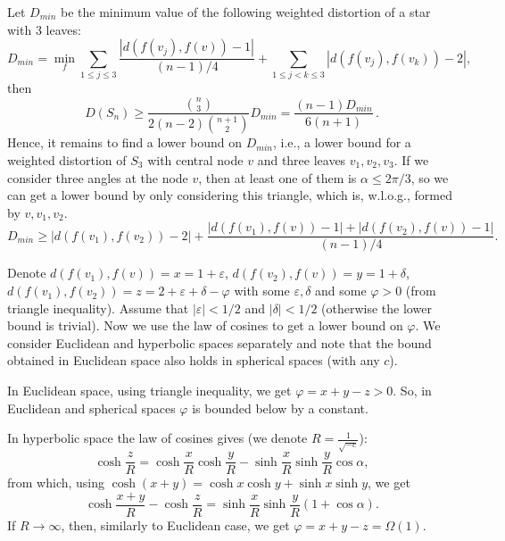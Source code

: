 \documentclass[runningheads]{llncs}
\begin{document}
Let $D_{min}$ be the minimum value of the following weighted distortion of a star with 3 leaves:
\[
D_{min} = \min_{f} \sum_{1\le j \le 3}  \frac{|d(f(v_j),f(v)) - 1|}{(n-1)/4} +
\sum_{1\le j < k\le 3}  |d(f(v_j),f(v_k)) - 2|,
\]
then 
\begin{equation}\label{eq:D_min}
D(S_n) \ge \frac{{n\choose 3}}{2(n-2){n+1 \choose 2}} D_{min} = \frac{ (n-1)D_{min}}{6(n+1)}\,.
\end{equation}
Hence, it remains to find a lower bound on $D_{min}$, i.e., a lower bound for a weighted distortion of $S_3$ with central node $v$ and three leaves $v_1, v_2, v_3$.
If we consider three angles at the node $v$, then at least one of them is $\alpha \le 2 \pi / 3$, so we can get a lower bound by only considering this triangle, which is, w.l.o.g., formed by $v, v_1, v_2$.
\[
D_{min} \ge  |d(f(v_1),f(v_2)) - 2| + \frac{|d(f(v_1),f(v)) - 1| + |d(f(v_2),f(v)) - 1|}{(n-1)/4}.
\]

Denote $d(f(v_1),f(v)) = x = 1 + \varepsilon$, $d(f(v_2),f(v)) = y = 1 + \delta$, $d(f(v_1),f(v_2)) = z = 2 + \varepsilon + \delta - \varphi$ with some $\varepsilon, \delta$ and some $\varphi > 0$ (from triangle inequality). Assume that $|\varepsilon| < 1/2$ and $|\delta| < 1/2$ (otherwise the lower bound is trivial). Now we use the law of cosines to get a lower bound on $\varphi$.
We consider Euclidean and hyperbolic spaces separately and note that the bound obtained in Euclidean space also holds in spherical spaces (with any $c$).

In Euclidean space, using triangle inequality, we get  $\varphi = x + y - z > 0$. So, in Euclidean and spherical spaces $\varphi$ is bounded below by a constant.

In hyperbolic space the law of cosines gives 
(we denote $R = \frac{1}{\sqrt{-c}}$):
\[
\cosh \frac{z}{R} = \cosh \frac{x}{R} \cosh \frac{y}{R} - \sinh \frac{x}{R} \sinh \frac{y}{R} \cos \alpha,
\]
from which, using $\cosh(x+y) =\cosh x\cosh y+\sinh x\sinh y$, we get 
\[
\cosh \frac{x+y}{R} - \cosh \frac{z}{R} = \sinh \frac{x}{R} \sinh \frac{y}{R} (1 + \cos \alpha). %
\]
If $R \to \infty$, then, similarly to Euclidean case, we get $\varphi = x + y - z = \Omega(1)$. 
\end{document}
